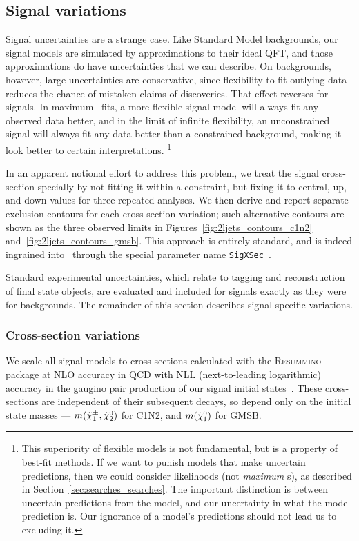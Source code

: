 \subsection{Signal variations}
\label{sec:2ljets_signal_variations}
Signal uncertainties are a strange case.
Like Standard Model backgrounds, our signal models are simulated by
approximations to their ideal QFT, and those approximations do have
uncertainties that we can describe.
On backgrounds, however, large uncertainties are conservative, since
flexibility to fit outlying data reduces the chance of mistaken claims of
discoveries.
That effect reverses for signals.
In maximum \heplikelihood\ fits, a more flexible
signal model will always fit any observed data better, and in the limit of
infinite flexibility, an unconstrained signal will always fit
any data better than a constrained background, making it look better to certain
interpretations.%
\footnote{%
This superiority of flexible models is not fundamental, but is a property of
best-fit methods.
If we want to punish models that make uncertain predictions, then we could
consider likelihoods (not \emph{maximum} \heplikelihood s), as described in
Section~\ref{sec:searches_searches}.
The important distinction is between uncertain predictions from the model,
and our uncertainty in what the model prediction is.
Our ignorance of a model's predictions should not lead us to excluding it.
}

In an apparent notional effort to address this problem, we treat the signal
cross-section specially by not fitting it within a constraint, but fixing it
to central, up, and down values for three repeated analyses.
We then derive and report separate exclusion contours for each cross-section
variation;
such alternative contours are shown as the three observed limits
in Figures~\ref{fig:2ljets_contours_c1n2} and~\ref{fig:2ljets_contours_gmsb}.
This approach is entirely standard, and is indeed ingrained into \histfitter\
through the special parameter name
\texttt{SigXSec}~\cite{baak2015histfitter, histfittergithub}.

Standard experimental uncertainties, which relate to tagging and
reconstruction of final state objects, are evaluated and included for signals
exactly as they were for backgrounds.
The remainder of this section describes signal-specific variations.

\subsubsection{Cross-section variations}
\label{sec:2ljets_xsec_variations}
We scale all signal models to cross-sections calculated with the
\textsc{Resummino} package at NLO accuracy in QCD with NLL
(next-to-leading logarithmic) accuracy in the gaugino pair production of our
signal initial states~\cite{Fuks:2012qx, Fuks:2013vua}.
These cross-sections are independent of their subsequent decays, so depend only
on the initial state masses ---
$m(\tilde\chi^\pm_1, \tilde\chi^0_2)$ for C1N2, and
$m(\tilde\chi^0_1)$ for GMSB.

